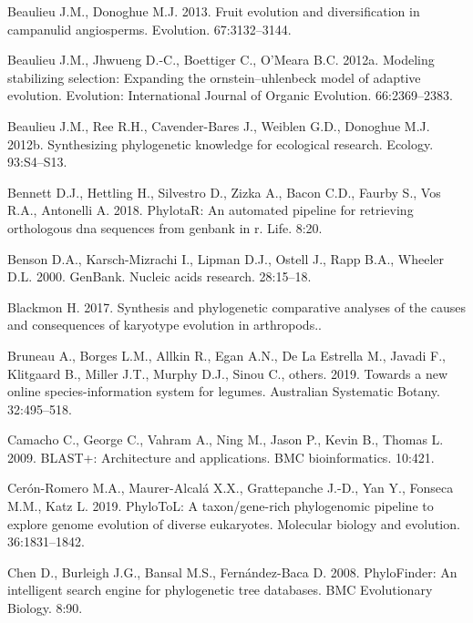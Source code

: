\documentclass[]{article}
\begin{document}
\leavevmode\hypertarget{ref-beaulieu2013fruit}{}%
Beaulieu J.M., Donoghue M.J. 2013. Fruit evolution and diversification in campanulid angiosperms. Evolution. 67:3132--3144.

\leavevmode\hypertarget{ref-beaulieu2012modeling}{}%
Beaulieu J.M., Jhwueng D.-C., Boettiger C., O'Meara B.C. 2012a. Modeling stabilizing selection: Expanding the ornstein--uhlenbeck model of adaptive evolution. Evolution: International Journal of Organic Evolution. 66:2369--2383.

\leavevmode\hypertarget{ref-beaulieu2012synthesizing}{}%
Beaulieu J.M., Ree R.H., Cavender-Bares J., Weiblen G.D., Donoghue M.J. 2012b. Synthesizing phylogenetic knowledge for ecological research. Ecology. 93:S4--S13.

\leavevmode\hypertarget{ref-bennett2018phylotar}{}%
Bennett D.J., Hettling H., Silvestro D., Zizka A., Bacon C.D., Faurby S., Vos R.A., Antonelli A. 2018. PhylotaR: An automated pipeline for retrieving orthologous dna sequences from genbank in r. Life. 8:20.

\leavevmode\hypertarget{ref-benson2000genbank}{}%
Benson D.A., Karsch-Mizrachi I., Lipman D.J., Ostell J., Rapp B.A., Wheeler D.L. 2000. GenBank. Nucleic acids research. 28:15--18.

\leavevmode\hypertarget{ref-blackmon2017synthesis}{}%
Blackmon H. 2017. Synthesis and phylogenetic comparative analyses of the causes and consequences of karyotype evolution in arthropods..

\leavevmode\hypertarget{ref-bruneau2019towards}{}%
Bruneau A., Borges L.M., Allkin R., Egan A.N., De La Estrella M., Javadi F., Klitgaard B., Miller J.T., Murphy D.J., Sinou C., others. 2019. Towards a new online species-information system for legumes. Australian Systematic Botany. 32:495--518.

\leavevmode\hypertarget{ref-camacho2009blast}{}%
Camacho C., George C., Vahram A., Ning M., Jason P., Kevin B., Thomas L. 2009. BLAST+: Architecture and applications. BMC bioinformatics. 10:421.

\leavevmode\hypertarget{ref-ceron2019phylotol}{}%
Cerón-Romero M.A., Maurer-Alcalá X.X., Grattepanche J.-D., Yan Y., Fonseca M.M., Katz L. 2019. PhyloToL: A taxon/gene-rich phylogenomic pipeline to explore genome evolution of diverse eukaryotes. Molecular biology and evolution. 36:1831--1842.

\leavevmode\hypertarget{ref-chen2008phylofinder}{}%
Chen D., Burleigh J.G., Bansal M.S., Fernández-Baca D. 2008. PhyloFinder: An intelligent search engine for phylogenetic tree databases. BMC Evolutionary Biology. 8:90.
\end{document}
